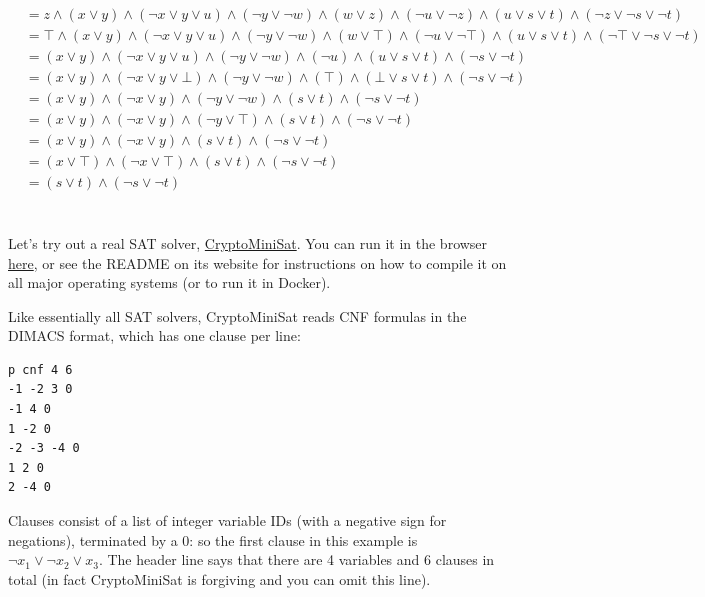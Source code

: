 \documentclass[11pt]{article}
\begin{document}
\begin{qunlist}
  \begin{answer}
    \begin{equation}
      \begin{split}
        &= z \land (x \lor y) \land (\lnot x \lor y \lor u) \land (\lnot y \lor \lnot w) \land (w \lor z) \land (\lnot u \lor \lnot z) \land (u \lor s \lor t) \land (\lnot z \lor \lnot s \lor \lnot t)\\
        &= \top \land (x \lor y) \land (\lnot x \lor y \lor u) \land (\lnot y \lor \lnot w) \land (w \lor \top) \land (\lnot u \lor \lnot \top) \land (u \lor s \lor t) \land (\lnot \top \lor \lnot s \lor \lnot t)\\
        &= (x \lor y) \land (\lnot x \lor y \lor u) \land (\lnot y \lor \lnot w) \land (\lnot u ) \land (u \lor s \lor t) \land (\lnot s \lor \lnot t)\\
        &= (x \lor y) \land (\lnot x \lor y \lor \bot) \land (\lnot y \lor \lnot w) \land (\top) \land (\bot \lor s \lor t) \land (\lnot s \lor \lnot t)\\
        &= (x \lor y) \land (\lnot x \lor y ) \land (\lnot y \lor \lnot w)  \land (s \lor t) \land (\lnot s \lor \lnot t)\\
        &= (x \lor y) \land (\lnot x \lor y ) \land (\lnot y \lor \top)  \land (s \lor t) \land (\lnot s \lor \lnot t)\\
        &= (x \lor y) \land (\lnot x \lor y ) \land (s \lor t) \land (\lnot s \lor \lnot t)\\
        &= (x \lor \top) \land (\lnot x \lor \top) \land (s \lor t) \land (\lnot s \lor \lnot t)\\
        &= (s \lor t) \land (\lnot s \lor \lnot t)\\
      \end{split}
    \end{equation}
  \end{answer}

  \\
  Let's try out a real SAT solver, \href{https://github.com/msoos/cryptominisat}{CryptoMiniSat}.
  You can run it in the browser \href{https://www.msoos.org/cryptominisat/}{here}, or see the README on its website for instructions on how to compile it on all major operating systems (or to run it in Docker).

  Like essentially all SAT solvers, CryptoMiniSat reads CNF formulas in the DIMACS format, which has one clause per line:
\begin{verbatim}
p cnf 4 6
-1 -2 3 0
-1 4 0
1 -2 0
-2 -3 -4 0
1 2 0
2 -4 0
\end{verbatim}
  Clauses consist of a list of integer variable IDs (with a negative sign for negations), terminated by a 0: so the first clause in this example is $\lnot x_1 \lor \lnot x_2 \lor x_3$.
  The header line says that there are 4 variables and 6 clauses in total (in fact CryptoMiniSat is forgiving and you can omit this line).


\end{qunlist}
\end{document}
